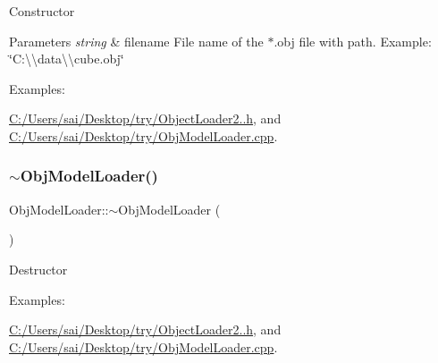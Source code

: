 Constructor 
\begin{DoxyParams}{Parameters}
{\em string} & filename File name of the $\ast$.obj file with path. Example\+: \char`\"{}\+C\+:\textbackslash{}\textbackslash{}data\textbackslash{}\textbackslash{}cube.\+obj\char`\"{} \\
\hline
\end{DoxyParams}
\begin{Desc}
\item[Examples\+: ]\par
\mbox{\hyperlink{_c_1_2_users_2sai_2_desktop_2try_2_object_loader2_88_8h-example}{C\+:/\+Users/sai/\+Desktop/try/\+Object\+Loader2..\+h}}, and \mbox{\hyperlink{_c_1_2_users_2sai_2_desktop_2try_2_obj_model_loader_8cpp-example}{C\+:/\+Users/sai/\+Desktop/try/\+Obj\+Model\+Loader.\+cpp}}.\end{Desc}
\mbox{\label{class_obj_model_loader_a203757d2c67c25889be3d61f140bc365}} 
\subsubsection{\texorpdfstring{$\sim$\+Obj\+Model\+Loader()}{~ObjModelLoader()}\hspace{0.1cm}{\footnotesize\ttfamily [1/3]}}
{\footnotesize\ttfamily Obj\+Model\+Loader\+::$\sim$\+Obj\+Model\+Loader (\begin{DoxyParamCaption}{ }\end{DoxyParamCaption})}

Destructor \begin{Desc}
\item[Examples\+: ]\par
\mbox{\hyperlink{_c_1_2_users_2sai_2_desktop_2try_2_object_loader2_88_8h-example}{C\+:/\+Users/sai/\+Desktop/try/\+Object\+Loader2..\+h}}, and \mbox{\hyperlink{_c_1_2_users_2sai_2_desktop_2try_2_obj_model_loader_8cpp-example}{C\+:/\+Users/sai/\+Desktop/try/\+Obj\+Model\+Loader.\+cpp}}.\end{Desc}
\mbox{\label{class_obj_model_loader_afcdb98fbbeba6fa0551b772ca959347d}} 
